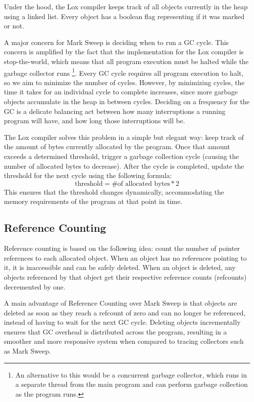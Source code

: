 \documentclass[10pt]{extarticle}
\begin{document}
Under the hood, the Lox compiler keeps track of all objects currently in the heap using a linked list. Every object has a boolean flag representing if it was marked or not. 

\medskip
A major concern for Mark Sweep is deciding when to run a GC cycle. This concern is amplified by the fact that the implementation for the Lox compiler is stop-the-world, which means that all program execution must be halted while the garbage collector runs \footnote{An alternative to this would be a concurrent garbage collector, which runs in a separate thread from the main program and can perform garbage collection as the program runs.}. Every GC cycle requires all program execution to halt, so we aim to minimize the number of cycles. However, by minimizing cycles, the time it takes for an individual cycle to complete increases, since more garbage objects accumulate in the heap in between cycles. Deciding on a frequency for the GC is a delicate balancing act between how many interruptions a running program will have, and how long those interruptions will be.

The Lox compiler solves this problem in a simple but elegant way: keep track of the amount of bytes currently allocated by the program. Once that amount exceeds a determined threshold, trigger a garbage collection cycle (causing the number of allocated bytes to decrease). After the cycle is completed, update the threshold for the next cycle using the following formula: \[\text{threshold} = \text{\# of allocated bytes} * 2\]This ensures that the threshold changes dynamically, accommodating the memory requirements of the program at that point in time.

\subsection{Reference Counting}

Reference counting is based on the following idea: count the number of pointer references to each allocated object. When an object has no references pointing to it, it is inaccessible and can be safely deleted. When an object is deleted, any objects referenced by that object get their respective  reference counts (refcounts) decremented by one. 

A main advantage of Reference Counting over Mark Sweep is that objects are deleted as soon as they reach a refcount of zero and can no longer be referenced, instead of having to wait for the next GC cycle. Deleting objects incrementally ensures that GC overhead is distributed across the program, resulting in a smoother and more responsive system when compared to tracing collectors such as Mark Sweep.
\end{document}
